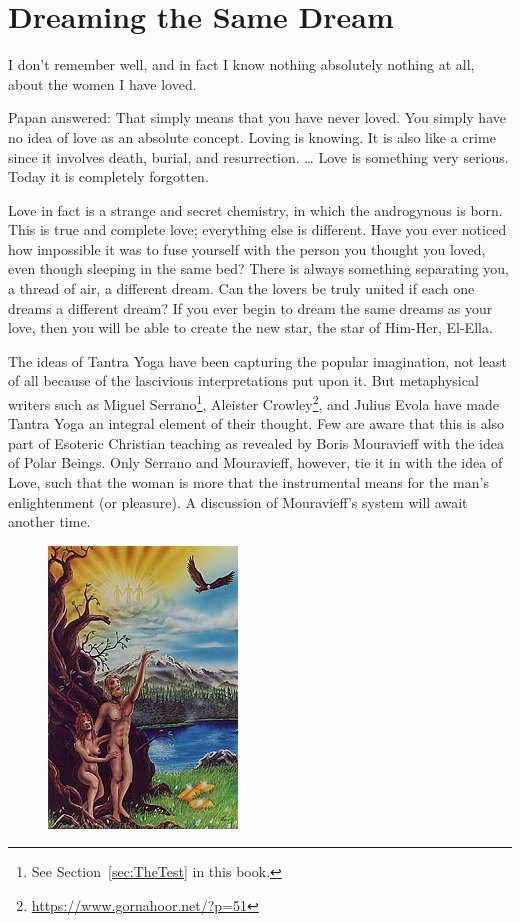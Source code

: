 \section{Dreaming the Same Dream}

\begin{quotex}
I don't remember well, and in fact I know nothing absolutely nothing at all, about the women I have loved.

Papan answered: That simply means that you have never loved. You simply have no idea of love as an absolute concept. Loving is knowing. It is also like a crime since it involves death, burial, and resurrection. … Love is something very serious. Today it is completely forgotten.

Love in fact is a strange and secret chemistry, in which the androgynous is born. This is true and complete love; everything else is different. Have you ever noticed how impossible it was to fuse yourself with the person you thought you loved, even though sleeping in the same bed? There is always something separating you, a thread of air, a different dream. Can the lovers be truly united if each one dreams a different dream? If you ever begin to dream the same dreams as your love, then you will be able to create the new star, the star of Him-Her, El-Ella. 

\end{quotex}
The ideas of Tantra Yoga have been capturing the popular imagination, not least of all because of the lascivious interpretations put upon it. But metaphysical writers such as Miguel Serrano\footnote{See Section~\ref{sec:TheTest} in this book.}, Aleister Crowley\footnote{\url{https://www.gornahoor.net/?p=51}}, and Julius Evola have made Tantra Yoga an integral element of their thought. Few are aware that this is also part of Esoteric Christian teaching as revealed by Boris Mouravieff with the idea of Polar Beings. Only Serrano and Mouravieff, however, tie it in with the idea of Love, such that the woman is more that the instrumental means for the man's enlightenment (or pleasure). A discussion of Mouravieff's system will await another time.

\begin{figure}
 \includegraphics[scale=.7]{a20110608DreamingtheSameDream-img001.jpg} 
\end{figure}

